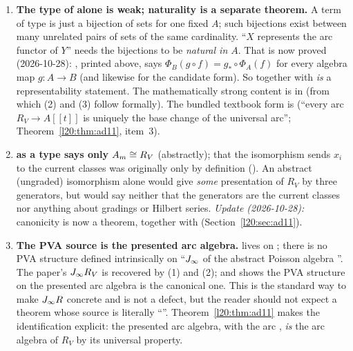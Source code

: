 \begin{warning}[title={What the types say, and what only the definitions say}]
\begin{enumerate}
\item \textbf{The type of  alone is weak; naturality is a separate theorem.} A term of type
   is just a bijection of sets for one fixed $A$; such bijections
  exist between many unrelated pairs of sets of the same cardinality. ``$X$ represents the arc functor of $Y$''
  needs the bijections to be \emph{natural in $A$}. That is now proved (2026-10-28): ,
  printed above, says $\Phi_B(g\circ f)=g_*\circ\Phi_A(f)$ for every algebra map $g:A\to B$ (and likewise
   for the candidate form). So  together with
   \emph{is} a representability statement. The mathematically strong content is in
   (from which (2) and (3) follow formally). The bundled textbook form is
   (``every arc $R_V\to A[[t]]$ is uniquely the base change of the universal arc'';
  Theorem~\ref{l20:thm:ad11}, item~3).
\item \textbf{ as a type says only $A_m\cong R_V$} (abstractly); that the isomorphism sends
  $x_i$ to the current classes was originally only by definition (). An abstract (ungraded) isomorphism alone would
  give \emph{some} presentation of $R_V$ by three generators, but would say neither that the generators are the current
  classes nor anything about gradings or Hilbert series. \emph{Update (2026-10-28):} canonicity is now a theorem,
   together with  (Section~\ref{l20:sec:ad11}).
\item \textbf{The PVA source is the presented arc algebra.}  lives on
  ; there is no PVA structure defined intrinsically on
  ``$J_\infty$ of the abstract Poisson algebra ''. The paper's $J_\infty R_V$ is recovered by
  (1) and (2); and  shows the PVA structure on the presented arc algebra is the canonical
  one. This is the standard way to make $J_\infty R$ concrete and is not a defect, but the reader should not
  expect a theorem whose source is literally ``''. Theorem~\ref{l20:thm:ad11} makes the identification
  explicit: the presented arc algebra, with the arc , \emph{is} the arc algebra of $R_V$ by its
  universal property.
\end{enumerate}
\end{warning}

